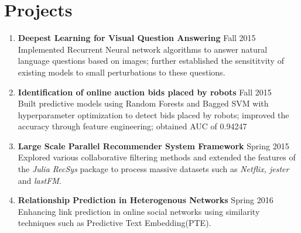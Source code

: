 \documentclass[resmargin,line]{res}
\begin{document}
\section{\sc Projects}
\begin{enumerate}[leftmargin=0.05cm, itemsep=2pt]
\item[] \textbf{Deepest Learning for Visual Question Answering} \hfill Fall 2015\\
Implemented Recurrent Neural network algorithms to answer natural language questions based on images; further established the sensititvity of existing models to small perturbations to these questions.
\item[] \textbf{Identification of online auction bids placed by robots} \hfill Fall 2015\\
Built predictive models using Random Forests and Bagged SVM with hyperparameter optimization to detect bids placed by robots; improved the accuracy through feature engineering; obtained AUC of 0.94247
\item[] \textbf{Large Scale Parallel Recommender System Framework} \hfill Spring 2015\\
Explored various collaborative filtering methods and extended the features of the \textit{Julia RecSys} package to process massive datasets such as \textit{Netflix, jester} and \textit{lastFM}.
\item[] \textbf{Relationship Prediction in Heterogenous Networks} \hfill Spring 2016 \\
Enhancing link prediction in online social networks using similarity techniques such as Predictive Text Embedding(PTE).
\end{enumerate}
\end{document}
